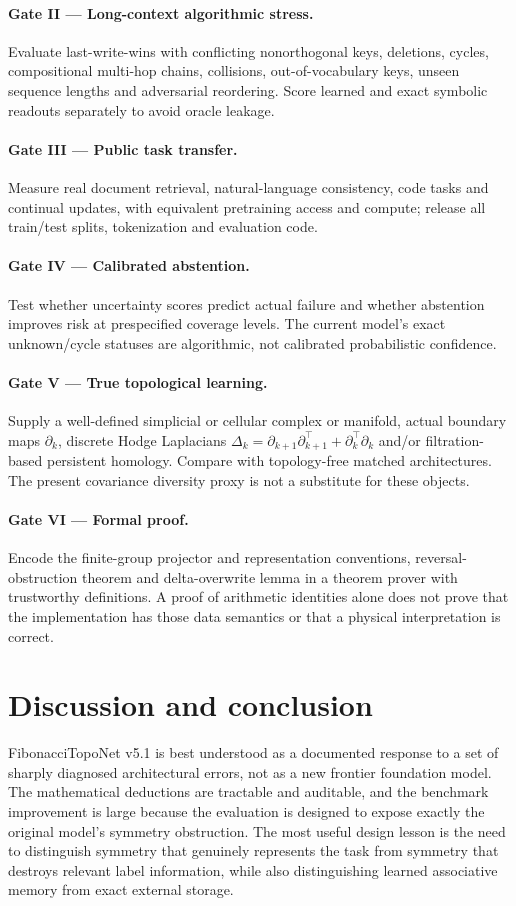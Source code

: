 \documentclass[11pt,a4paper]{article}
\theoremstyle{plain}\newtheorem{theorem}{Theorem}[section]\newtheorem{proposition}[theorem]{Proposition}\newtheorem{lemma}[theorem]{Lemma}
\theoremstyle{definition}\newtheorem{definition}[theorem]{Definition}\newtheorem{remark}[theorem]{Remark}\newtheorem{counterexample}[theorem]{Counterexample}
\begin{document}
\paragraph{Gate II --- Long-context algorithmic stress.} Evaluate last-write-wins with conflicting nonorthogonal keys, deletions, cycles, compositional multi-hop chains, collisions, out-of-vocabulary keys, unseen sequence lengths and adversarial reordering. Score learned and exact symbolic readouts separately to avoid oracle leakage.
\paragraph{Gate III --- Public task transfer.} Measure real document retrieval, natural-language consistency, code tasks and continual updates, with equivalent pretraining access and compute; release all train/test splits, tokenization and evaluation code.
\paragraph{Gate IV --- Calibrated abstention.} Test whether uncertainty scores predict actual failure and whether abstention improves risk at prespecified coverage levels. The current model's exact unknown/cycle statuses are algorithmic, not calibrated probabilistic confidence.
\paragraph{Gate V --- True topological learning.} Supply a well-defined simplicial or cellular complex or manifold, actual boundary maps $\partial_k$, discrete Hodge Laplacians $\Delta_k=\partial_{k+1}\partial_{k+1}^{\top}+\partial_k^{\top}\partial_k$ and/or filtration-based persistent homology. Compare with topology-free matched architectures. The present covariance diversity proxy is not a substitute for these objects.
\paragraph{Gate VI --- Formal proof.} Encode the finite-group projector and representation conventions, reversal-obstruction theorem and delta-overwrite lemma in a theorem prover with trustworthy definitions. A proof of arithmetic identities alone does not prove that the implementation has those data semantics or that a physical interpretation is correct.

\section{Discussion and conclusion}
FibonacciTopoNet v5.1 is best understood as a documented response to a set of sharply diagnosed architectural errors, not as a new frontier foundation model. The mathematical deductions are tractable and auditable, and the benchmark improvement is large because the evaluation is designed to expose exactly the original model's symmetry obstruction. The most useful design lesson is the need to distinguish symmetry that genuinely represents the task from symmetry that destroys relevant label information, while also distinguishing learned associative memory from exact external storage.
\end{document}
